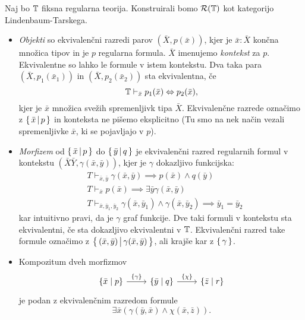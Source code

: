 \documentclass[../kategoricna_logika.tex]{subfiles}
\begin{document}
\begin{definicija}
  Naj bo $\mathbb{T}$ fiksna regularna teorija. Konstruirali bomo
  $\mathcal{R}(\mathbb{T})$ kot kategorijo Lindenbaum-Tarskega.
  \begin{itemize}
  \item \emph{Objekti} so ekvivalenčni razredi parov
    $(\bar{X}, p(\bar{x}))$, kjer je $\bar{x} : \bar{X}$ končna
    množica tipov in je $p$ regularna formula.  $\bar{X}$ imenujemo
    \emph{kontekst} za $p$. Ekvivalentne so lahko le formule v istem
    kontekstu.  Dva taka para $(\bar{X}, p_1(\bar{x}_1))$ in
    $(\bar{X}, p_2(\bar{x}_2))$ sta ekvivalentna, če
      $$\mathbb{T} \vdash_{\bar{x}} p_1(\bar{x}) \Leftrightarrow p_2(\bar{x}),$$
      kjer je $\bar{x}$ množica svežih spremenljivk tipa $\bar{X}$.
      Ekvivalenčne razrede označimo z $\left\lbrace\,\bar{x} \,\middle|\, p\,\right\rbrace$
      in konteksta ne pišemo eksplicitno (Tu smo na nek način vezali
      spremenljivke $\bar{x}$, ki se pojavljajo v $p$).
    \item \emph{Morfizem} od $\left\lbrace\,\bar{x} \,\middle|\, p\,\right\rbrace$ do
      $\left\lbrace\,\bar{y} \,\middle|\, q\,\right\rbrace$ je ekvivalenčni razred regularnih
      formul v kontekstu $(\bar{X}\bar{Y}, \gamma(\bar{x},\bar{y}))$,
      kjer je $\gamma$ dokazljivo funkcijska:
      \begin{align*}
        &T \vdash_{\bar{x},\bar{y}} \gamma(\bar{x},\bar{y})  \implies p(\bar{x}) \wedge q(\bar{y}) \\
        &T \vdash_{\bar{x}} p(\bar{x}) \implies \exists \bar{y} \gamma(\bar{x},\bar{y}) \\
        &T \vdash_{\bar{x},\bar{y}_1,\bar{y}_2} \gamma(\bar{x},\bar{y}_1) \wedge \gamma(\bar{x},\bar{y}_2) \implies \bar{y}_1 = \bar{y}_2
      \end{align*}
      kar intuitivno pravi, da je $\gamma$ graf funkcije.  Dve taki
      formuli v kontekstu sta ekvivalentni, če sta dokazljivo
      ekvivalentni v $\mathbb{T}$.  Ekvivalenčni razred take formule označimo
      z
      $\left\lbrace\,(\bar{x},\bar{y}) \,\middle|\, \gamma(\bar{x},\bar{y})\,\right\rbrace$,
      ali krajše kar z $\left\lbrace\,\gamma\,\right\rbrace$.
    \item Kompozitum dveh morfizmov
      \begin{equation*}
        \begin{tikzcd}[column sep=normal]
          \lbrace \bar{x} \mid p\rbrace \ar[r, "\lbrace \gamma
          \rbrace"] & \lbrace \bar{y} \mid q \rbrace \ar[r, "\lbrace
          \chi \rbrace"] & \lbrace \bar{z} \mid r \rbrace
        \end{tikzcd}
      \end{equation*}           
      je podan z ekvivalenčnim razredom formule
      $$\exists \bar{x}(\gamma(\bar{y},\bar{x}) \wedge \chi(\bar{x},\bar{z})).$$
    \end{itemize}
  \end{definicija}
\end{document}
